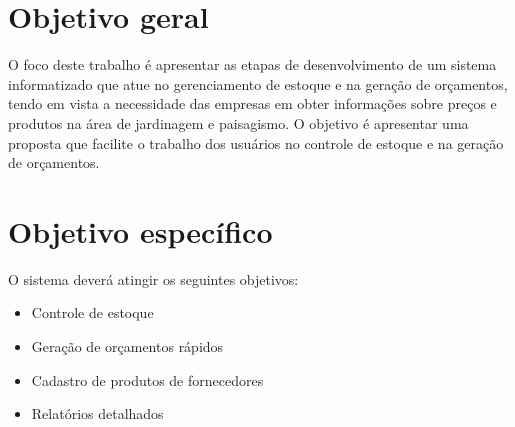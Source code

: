 \section{Objetivo geral}

    O foco deste trabalho é apresentar as etapas de desenvolvimento de um sistema informatizado que atue no gerenciamento de estoque  e na geração de orçamentos, tendo em vista a necessidade das empresas em obter informações sobre preços e produtos na área de jardinagem e paisagismo.
 O objetivo é apresentar uma proposta que facilite o trabalho dos usuários no controle de estoque e na geração de orçamentos.



\section{Objetivo específico}



O sistema deverá atingir os seguintes objetivos:

\begin{itemize}
   \item Controle de estoque
   \item Geração de orçamentos rápidos
   \item Cadastro de produtos de fornecedores
   \item Relatórios detalhados
   
 \end{itemize}




